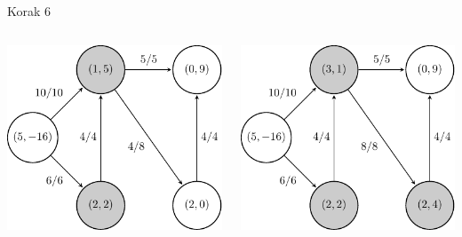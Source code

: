 \documentclass{beamer}
\begin{document}
\begin{frame}{Korak 6}
    \begin{columns}
        \begin{column}{0.5\textwidth}
            \centering
            \includegraphics[scale=0.7]{../writing/images/graf2-7.pdf}
        \end{column}

        \begin{column}{0.5\textwidth}
            \centering
            \includegraphics[scale=0.7]{../writing/images/graf2-8.pdf}
        \end{column}
    \end{columns}
\end{frame}
\end{document}
